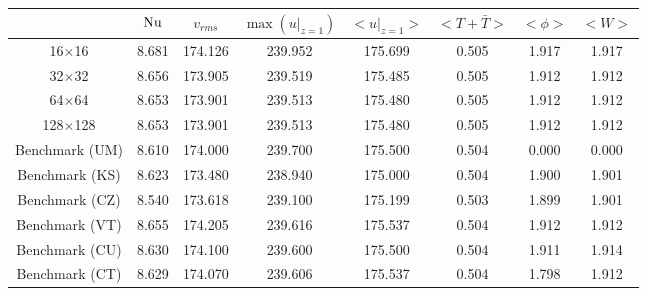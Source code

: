 \begin{tabular}{c|ccccccc}
    & $\mathrm{Nu}$ & $v_{rms}$ & $\max(u|_{z=1})$ & $<u|_{z=1}>$ & $<T + \bar{T}>$ & $<\phi>$ & $<W>$ \\
\hline
16$\times$16 & 8.681 & 174.126 & 239.952 & 175.699 & 0.505 & 1.917 & 1.917 \\
32$\times$32 & 8.656 & 173.905 & 239.519 & 175.485 & 0.505 & 1.912 & 1.912 \\
64$\times$64 & 8.653 & 173.901 & 239.513 & 175.480 & 0.505 & 1.912 & 1.912 \\
128$\times$128 & 8.653 & 173.901 & 239.513 & 175.480 & 0.505 & 1.912 & 1.912 \\
\hline
Benchmark (UM) & 8.610 & 174.000 & 239.700 & 175.500 & 0.504 & 0.000 & 0.000 \\
Benchmark (KS) & 8.623 & 173.480 & 238.940 & 175.000 & 0.504 & 1.900 & 1.901 \\
Benchmark (CZ) & 8.540 & 173.618 & 239.100 & 175.199 & 0.503 & 1.899 & 1.901 \\
Benchmark (VT) & 8.655 & 174.205 & 239.616 & 175.537 & 0.504 & 1.912 & 1.912 \\
Benchmark (CU) & 8.630 & 174.100 & 239.600 & 175.500 & 0.504 & 1.911 & 1.914 \\
Benchmark (CT) & 8.629 & 174.070 & 239.606 & 175.537 & 0.504 & 1.798 & 1.912 \\
\end{tabular}
